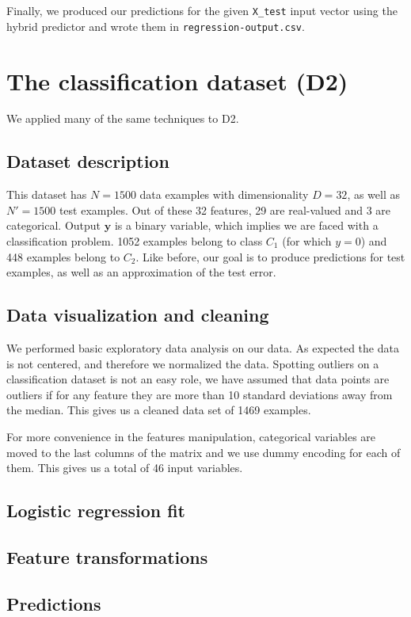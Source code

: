 \documentclass{article} %
\begin{document}
  Finally, we produced our predictions for the given \texttt{X\_test} input vector using the hybrid predictor and wrote them in \texttt{regression-output.csv}.

\section{The classification dataset (D2)}
  We applied many of the same techniques to D2.

  \subsection{Dataset description}
  This dataset has $N = 1500$ data examples with dimensionality $D = 32$, as well as $N' = 1500$ test examples. Out of these 32 features, 29 are real-valued and 3 are categorical. Output $\mathbf{y}$ is a binary variable, which implies we are faced with a classification problem. 1052 examples belong to class $C_1$ (for which $y = 0$) and 448 examples belong to $C_2$. Like before, our goal is to produce predictions for test examples, as well as an approximation of the test error.

  \subsection{Data visualization and cleaning}
We performed basic exploratory data analysis on our data. As expected the data is not centered, and therefore we normalized the data. Spotting outliers on a classification dataset is not an easy role, we have assumed that data points are outliers if for any feature they are more than 10 standard deviations away from the median. This gives us a cleaned data set of 1469 examples.

For more convenience in the features manipulation, categorical variables are moved to the last columns of the matrix and we use dummy encoding for each of them. This gives us a total of 46 input variables.

  \subsection{Logistic regression fit}

  \subsection{Feature transformations}

  \subsection{Predictions}
\end{document}
